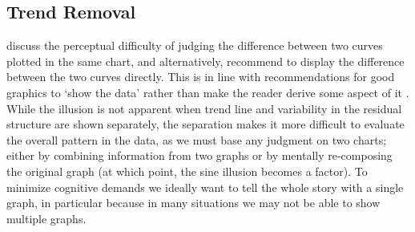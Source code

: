 \documentclass[12pt]{article}\usepackage[]{graphicx}\usepackage[]{color}
\newcommand{\newdo}[1]{\todo[inline, color=Plum]{#1}} %
\begin{document}
\subsection{Trend Removal}
\cite{cleveland:1984, cleveland:1985} discuss the perceptual difficulty of judging the difference between two curves plotted in the same chart, and alternatively, recommend to display the difference between the two curves directly. This is in line with  recommendations  for good graphics to `show the data' rather than make the reader derive some aspect of it \citep[e.g.][]{wainer:2000}. 
%  
While the illusion is not apparent when trend line and variability in the  residual structure are shown separately, the separation makes it  more difficult to evaluate the overall  pattern in the data, as we  must base any judgment on two charts; either by combining information from two graphs or by mentally re-composing the original graph (at which point, the sine illusion becomes a factor). To minimize cognitive demands we ideally want to tell the whole story with a single graph, in particular because in many situations we may not be able to show multiple graphs. 


\end{document}
